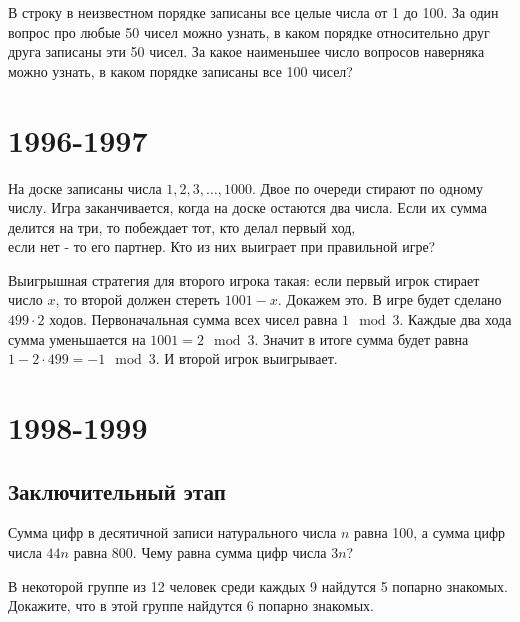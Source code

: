\documentclass[11pt, a4paper]{common/document_template}
\begin{document}
\begin{exercise}
В строку в неизвестном порядке записаны все целые числа от 1 до
100. За один вопрос про любые 50 чисел можно узнать, в каком порядке относительно друг друга записаны эти 50 чисел. За какое наименьшее число вопросов наверняка можно узнать, в каком порядке записаны все 100 чисел?
\end{exercise}


\chapter{1996-1997}

\begin{exercise}
На доске записаны числа $1, 2, 3, \dots, 1000$. Двое по очереди стирают по одному числу. Игра заканчивается, когда на доске остаются два числа. Если их сумма делится на три, то побеждает тот, кто делал первый ход, \\ если нет - то его партнер. Кто из них выиграет при правильной игре?
\end{exercise}

\begin{Solution}
Выигрышная стратегия для второго игрока такая: если первый игрок стирает число $x$, то второй должен стереть $1001 - x$. Докажем это.
В игре будет сделано $499 \cdot 2$ ходов. Первоначальная сумма всех чисел равна $1 \mod 3$. Каждые два хода сумма уменьшается на $1001 =  2 \mod 3$. Значит в итоге сумма будет равна $1 - 2 \cdot 499 = -1 \mod 3$. И второй игрок выигрывает.
\end{Solution}

\chapter{1998-1999}

\section{Заключительный этап}

\begin{exercise}
Сумма цифр в десятичной записи натурального числа $n$ равна 100, а сумма цифр числа $44n$ равна 800. Чему равна сумма цифр числа $3n$?
\end{exercise}

\begin{Solution}

\end{Solution}

\begin{exercise}
В некоторой группе из 12 человек среди каждых 9 найдутся 5 попарно знакомых. Докажите, что в этой группе найдутся 6 попарно знакомых.
\end{exercise}
\end{document}
